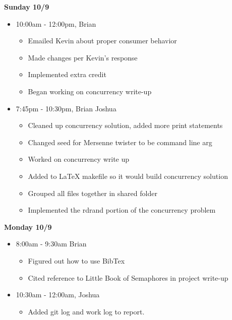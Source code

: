 \documentclass[letterpaper, onecolumn, draftclsnofoot, 10pt, compsoc]{IEEEtran}
\begin{document}
    \textbf{Sunday 10/9}
        \begin{itemize}
            \item 10:00am - 12:00pm, Brian
            \begin{itemize}
                \item Emailed Kevin about proper consumer behavior
                \item Made changes per Kevin's response
                \item Implemented extra credit
                \item Began working on concurrency write-up
            \end{itemize}
            \item 7:45pm - 10:30pm, Brian Joshua
                \begin{itemize}
                    \item Cleaned up concurrency solution, added more print statements
                    \item Changed seed for Mersenne twister to be command line arg
                    \item Worked on concurrency write up
                    \item Added to LaTeX makefile so it would build concurrency solution
                    \item Grouped all files together in shared folder
                    \item Implemented the rdrand portion of the concurrency problem
                \end{itemize}
        \end{itemize}
    \textbf{Monday 10/9}
        \begin{itemize}
            \item 8:00am - 9:30am Brian
            \begin{itemize}
                \item Figured out how to use BibTex
                \item Cited reference to Little Book of Semaphores in project write-up
            \end{itemize}
            \item 10:30am - 12:00am, Joshua
                \begin{itemize}
                    \item Added git log and work log to report.
                \end{itemize}
        \end{itemize}

{}

\end{document}
